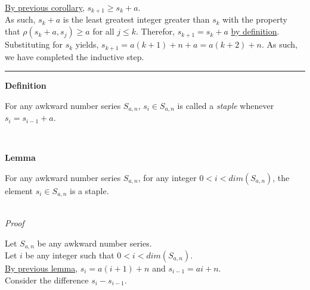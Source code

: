 \documentclass[a4paper,12pt]{article}
\begin{document}
\noindent \hyperlink{corollary:non_divisibility_of_elements}{By previous corollary}, $s_{k + 1} \geq s_k + a$.\\

\noindent As such, $s_k + a$ is the least greatest integer greater than $s_k$ with the property that $\rho(s_k + a, s_j) \geq a$ for all $j \leq k$. Therefor, $s_{k + 1} = s_k + a$ \hyperlink{definition:awkward_number_series}{by definition}.\\

\noindent Substituting for $s_k$ yields, $s_{k + 1} = a(k + 1) + n + a = a(k + 2) + n$. As such, we have completed the inductive step.

\begin{center}
\noindent\rule{8cm}{0.4pt}
\end{center}




\label{definition:staple}
\hypertarget{definition:staple}{}
\begin{tcolorbox}
\textbf{Definition}

For any awkward number series $S_{a,n}$, $s_i \in S_{a, n}$ is called a \textit{staple} whenever $s_i = s_{i - 1} + a$.

\end{tcolorbox}
\noindent \\






\label{lemma:initial_staples}
\hypertarget{lemma:initial_staples}{}
\begin{tcolorbox}
\textbf{Lemma}

For any awkward number series $S_{a,n}$, for any integer $0 < i < dim(S_{a,n})$, the element $s_i \in S_{a,n}$ is a staple.

\end{tcolorbox}

\noindent \\
\textit{Proof}

\noindent Let $S_{a, n}$ be any awkward number series.\\

\noindent Let $i$ be any integer such that $0 < i < dim(S_{a, n})$.\\

\noindent \hyperlink{lemma:basis_lengths}{By previous lemma}, $s_i = a(i + 1) + n$ and $s_{i - 1} = ai + n$.\\

\noindent Consider the difference $s_i - s_{i - 1}$.\\
\end{document}
